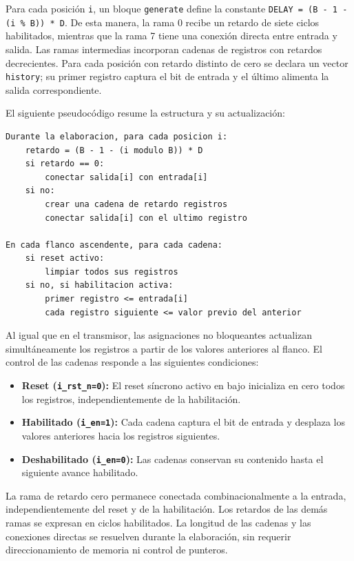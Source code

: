 \documentclass[10pt,a4paper]{article}
\begin{document}
Para cada posición \texttt{i}, un bloque \texttt{generate} define
la constante \texttt{DELAY = (B - 1 - (i \% B)) * D}. De esta manera,
la rama 0 recibe un retardo de siete ciclos habilitados, mientras
que la rama 7 tiene una conexión directa entre entrada y salida.
Las ramas intermedias incorporan cadenas de registros con retardos
decrecientes. Para cada posición con retardo distinto de cero se
declara un vector \texttt{history}; su primer registro captura el
bit de entrada y el último alimenta la salida correspondiente.

El siguiente pseudocódigo resume la estructura y su actualización:

\begin{lstlisting}[basicstyle=\ttfamily\small]
Durante la elaboracion, para cada posicion i:
    retardo = (B - 1 - (i modulo B)) * D
    si retardo == 0:
        conectar salida[i] con entrada[i]
    si no:
        crear una cadena de retardo registros
        conectar salida[i] con el ultimo registro

En cada flanco ascendente, para cada cadena:
    si reset activo:
        limpiar todos sus registros
    si no, si habilitacion activa:
        primer registro <= entrada[i]
        cada registro siguiente <= valor previo del anterior
\end{lstlisting}

Al igual que en el transmisor, las asignaciones no bloqueantes
actualizan simultáneamente los registros a partir de los valores
anteriores al flanco. El control de las cadenas responde a las
siguientes condiciones:

\begin{itemize}
    \item \textbf{Reset (\texttt{i\_rst\_n=0}):}
    El reset síncrono activo en bajo inicializa en cero todos los
    registros, independientemente de la habilitación.

    \item \textbf{Habilitado (\texttt{i\_en=1}):}
    Cada cadena captura el bit de entrada y desplaza los valores
    anteriores hacia los registros siguientes.

    \item \textbf{Deshabilitado (\texttt{i\_en=0}):}
    Las cadenas conservan su contenido hasta el siguiente avance
    habilitado.
\end{itemize}

La rama de retardo cero permanece conectada combinacionalmente a
la entrada, independientemente del reset y de la habilitación.
Los retardos de las demás ramas se expresan en ciclos habilitados.
La longitud de las cadenas y las conexiones directas se resuelven
durante la elaboración, sin requerir direccionamiento de memoria
ni control de punteros.
\end{document}
